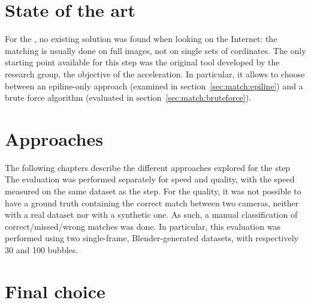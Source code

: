 \section{State of the art}

For the \match*, no existing solution was found when looking on the Internet: the matching is usually done on full images, not on single sets of cordinates.
The only starting point available for this step was the original tool developed by the research group, the objective of the acceleration.
In particular, it allows to choose between an epiline-only approach (examined in section~\ref{sec:match:epiline}) and a brute force algorithm (evaluated in section~\ref{sec:match:bruteforce}).

\section{Approaches}

The following chapters describe the different approaches explored for the \match* step
The evaluation was performed separately for speed and quality, with the speed measured on the same dataset as the \linkDD* step.
For the quality, it was not possible to have a ground truth containing the correct match between two cameras, neither with a real dataset nor with a synthetic one.
As such, a manual classification of correct/missed/wrong matches was done.
In particular, this evaluation was performed using two single-frame, Blender-generated datasets, with respectively 30 and 100 bubbles.

\newpage
 \newpage
 \newpage
 \newpage
 \newpage
 \newpage
 \newpage
 \newpage

\section{Final choice}
